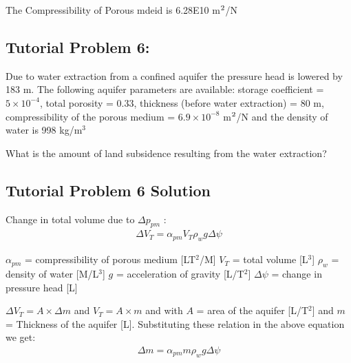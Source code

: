 \documentclass[letterpaper,10pt,english]{sphinxmanual}
\begin{document}
\begin{sphinxVerbatim}[commandchars=\\\{\}]
The Compressibility of Porous mdeid is 6.28E\PYGZhy{}10 m\(\sp{\text{2}}\)/N
\end{sphinxVerbatim}


\subsection{Tutorial Problem 6:}
\label{\detokenize{contents/tutorials/tutorial_02/tutorial_02:tutorial-problem-6}}
Due to water extraction from a confined aquifer the pressure head is
lowered by 183 m. The following aquifer parameters are available: storage
coefficient = \(5\times10^{-4}\), total porosity = 0.33, thickness (before water
extraction) = 80 m, compressibility of the porous medium = \(6.9\times 10^{-8}\) m\(\sp{\text{2}}\)/N and the density of water is 998 kg/m\(^3\)

What is the amount of land subsidence resulting from the water extraction?


\subsection{Tutorial Problem 6 \textendash{} Solution}
\label{\detokenize{contents/tutorials/tutorial_02/tutorial_02:tutorial-problem-6-solution}}

Change in total volume due to \(\Delta p_{pm}\) :
\begin{equation*}
\begin{split} \Delta V_T = \alpha_{pm} V_T\rho_w g \Delta \psi \end{split}
\end{equation*}


\(\alpha_{pm}\) =	compressibility of porous medium {[}LT\(^2\)/M{]} \(V_T\) = total volume {[}L\(^3\){]}                  \(\rho_w\) = density of water {[}M/L\(^3\){]}          \(g\) = acceleration of gravity {[}L/T\(^2\){]}        \(\Delta \psi\) = change in pressure head {[}L{]}

\(\Delta V_T = A\times\Delta m\) and 
\(V_T = A\times m\) and 
with \(A\) = area of the aquifer {[}L/T\(^2\){]} and 
\(m\) = Thickness of the aquifer {[}L{]}.
Substituting these relation in the above equation we get:
\begin{equation*}
\begin{split} \Delta m = \alpha_{pm} m\rho_w g \Delta \psi \end{split}
\end{equation*}
\end{document}
